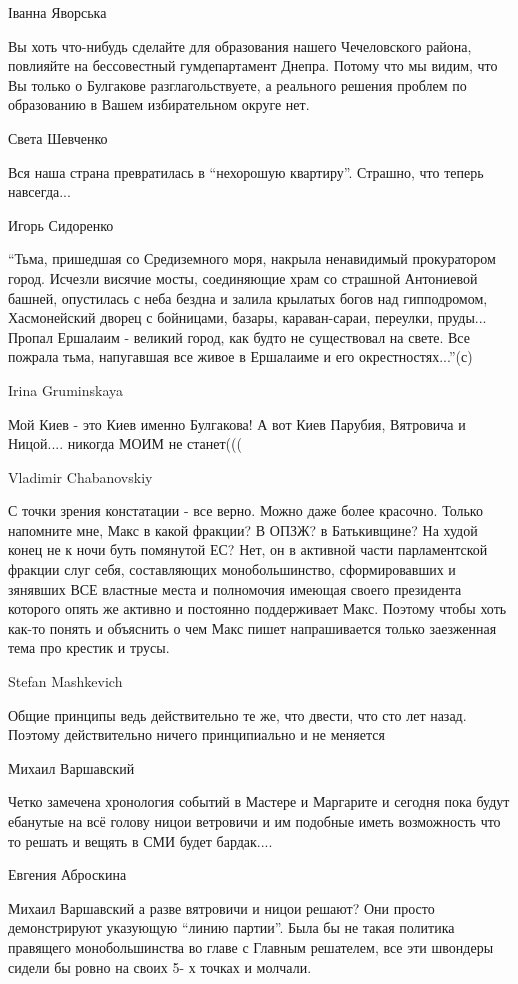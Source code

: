 Іванна Яворська

Вы хоть что-нибудь сделайте для образования нашего Чечеловского района,
повлияйте на бессовестный гумдепартамент Днепра. Потому что мы видим, что Вы
только о Булгакове разглагольствуете, а реального решения проблем по
образованию в Вашем избирательном округе нет.

Света Шевченко

Вся наша страна превратилась в \enquote{нехорошую квартиру}. Страшно, что
теперь навсегда...

Игорь Сидоренко

\enquote{Тьма, пришедшая со Средиземного моря, накрыла ненавидимый прокуратором город.
Исчезли висячие мосты, соединяющие храм со страшной Антониевой башней,
опустилась с неба бездна и залила крылатых богов над гипподромом, Хасмонейский
дворец с бойницами, базары, караван-сараи, переулки, пруды... Пропал Ершалаим -
великий город, как будто не существовал на свете. Все пожрала тьма, напугавшая
все живое в Ершалаиме и его окрестностях...}(с)

Irina Gruminskaya

Мой Киев - это Киев именно Булгакова! А вот Киев Парубия, Вятровича и Ницой....
никогда МОИМ не станет(((

Vladimir Chabanovskiy

С точки зрения констатации - все верно. Можно даже более красочно.
Только напомните мне, Макс в какой фракции?
В ОПЗЖ? в Батькивщине? На худой конец не к ночи буть помянутой ЕС?
Нет, он в активной части парламентской фракции слуг себя, составляющих монобольшинство, сформировавших и зянявших ВСЕ властные места и полномочия имеющая своего президента которого опять же активно и постоянно поддерживает Макс.
Поэтому чтобы хоть как-то понять и объяснить о чем Макс пишет напрашивается только заезженная тема про крестик и трусы.

Stefan Mashkevich

Общие принципы ведь действительно те же, что двести, что сто лет назад.
Поэтому действительно ничего принципиально и не меняется

Михаил Варшавский

Четко замечена хронология событий в Мастере и Маргарите и сегодня пока будут
ебанутые на всё голову ницои ветровичи и им подобные иметь возможность что то
решать и вещять в СМИ будет бардак....

Евгения Аброскина

Михаил Варшавский а разве вятровичи и ницои решают? Они просто демонстрируют
указующую \enquote{линию партии}. Была бы не такая политика правящего монобольшинства
во главе с Главным решателем, все эти швондеры сидели бы ровно на своих 5- х
точках и молчали.

